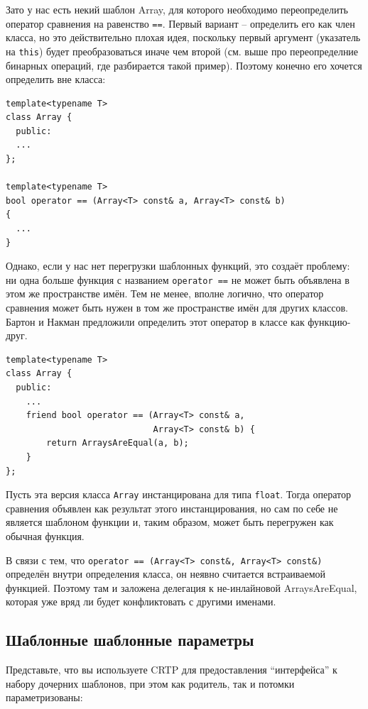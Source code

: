 \documentclass[a4paper,12pt,oneside]{article}
\begin{document}
Зато у нас есть некий шаблон Array, для которого необходимо переопределить оператор сравнения на равенство \lstinline!==!. Первый вариант -- определить его как член класса, но это действительно плохая идея, поскольку первый аргумент (указатель на \lstinline!this!) будет преобразоваться иначе чем второй (см. выше про переопределние бинарных операций, где разбирается такой пример). Поэтому конечно его хочется определить вне класса:

\begin{lstlisting}
template<typename T> 
class Array { 
  public: 
  ...
}; 

template<typename T> 
bool operator == (Array<T> const& a, Array<T> const& b) 
{ 
  ... 
} 
\end{lstlisting}

Однако, если у нас нет перегрузки шаблонных функций, это создаёт проблему: ни одна больше функция с названием \lstinline!operator ==! не может быть объявлена в этом же пространстве имён. Тем не менее, вполне логично, что оператор сравнения может быть нужен в том же пространстве имён для других классов. Бартон и Накман предложили определить этот оператор в классе как функцию-друг.

\begin{lstlisting}
template<typename T> 
class Array { 
  public: 
    ... 
    friend bool operator == (Array<T> const& a, 
                             Array<T> const& b) { 
        return ArraysAreEqual(a, b); 
    } 
}; 
\end{lstlisting}

Пусть эта версия класса \lstinline!Array! инстанцирована для типа \lstinline!float!. Тогда оператор сравнения объявлен как результат этого инстанцирования, но сам по себе не является шаблоном функции и, таким образом, может быть перегружен как обычная функция.

В связи с тем, что \lstinline!operator == (Array<T> const&, Array<T> const&)! определён внутри определения класса, он неявно считается встраиваемой функцией. Поэтому там и заложена делегация к не-инлайновой ArraysAreEqual, которая уже вряд ли будет конфликтовать с другими именами.

\subsection{Шаблонные шаблонные параметры}

Представьте, что вы используете CRTP для предоставления ``интерфейса'' к набору дочерних шаблонов, при этом как родитель, так и потомки параметризованы:
\end{document}
